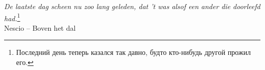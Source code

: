 









\pagebreak

\begin{center}
\textit{De laatste dag scheen nu zoo lang geleden,  dat ’t was alsof een ander die doorleefd had.}\footnote{\footnotesize{Последний день теперь казался так давно, будто кто-нибудь другой прожил его.}}\\
Nescio – Boven het dal
\end{center}

\tableofcontents


\mainmatter












\printglossary \label{gloss}

\printbibliography






